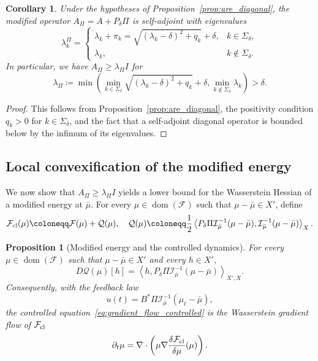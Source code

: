 \documentclass[11pt]{article}
\numberwithin{equation}{section}
\newtheorem{proposition}[theorem]{Proposition}
\newtheorem{corollary}[theorem]{Corollary}
\theoremstyle{definition}
\newcommand{\F}{\mathcal{F}}
\newcommand{\rieszmap}[1][\mu]{\mathcal{I}_{#1}}
\begin{document}
\begin{corollary}
\label{cor:spectral_gap}
    Under the hypotheses of Proposition~\ref{prop:are_diagonal}, the modified operator $A_\Pi = A + P_\delta \Pi$ is self-adjoint with eigenvalues
    \[
    \lambda_k^\Pi =
    \begin{cases}
        \lambda_k + \pi_k = \sqrt{(\lambda_k-\delta)^2 + q_k} + \delta, & k \in \Sigma_\delta,\\
        \lambda_k, & k \notin \Sigma_\delta.
    \end{cases}
    \]
    In particular, we have $A_\Pi \ge \lambda_\Pi I$ for
    \[
    \lambda_\Pi \coloneqq \min\left(\min_{k \in \Sigma_\delta}\sqrt{(\lambda_k-\delta)^2 + q_k} + \delta, \min_{k\notin\Sigma_\delta} \lambda_k\right) > \delta.
    \]
\end{corollary}

\begin{proof}
    This follows from Proposition~\ref{prop:are_diagonal}, the positivity condition $q_k > 0$ for $k \in \Sigma_\delta$, and the fact that a self-adjoint diagonal operator is bounded below by the infimum of its eigenvalues.
\end{proof}

\subsection{Local convexification of the modified energy}
\label{sec:convexification}

We now show that $A_\Pi \ge \lambda_\Pi I$ yields a lower bound for the Wasserstein Hessian of a modified energy at $\bar\mu$.
For every $\mu \in \operatorname{dom}(\F)$ such that $\mu - \bar\mu \in X'$, define
\[
\F_{\rm cl}(\mu) \coloneqq \F(\mu) + \mathcal{Q}(\mu), \quad \mathcal{Q}(\mu) \coloneqq \frac{1}{2}\left\langle P_\delta \Pi \rieszmap[\bar\mu]^{-1}(\mu - \bar\mu), \rieszmap[\bar\mu]^{-1}(\mu - \bar\mu)\right\rangle_X.
\]

\begin{proposition}[Modified energy and the controlled dynamics]
\label{prop:modified_energy_closed_loop}
    For every $\mu \in \operatorname{dom}(\F)$ such that $\mu - \bar\mu \in X'$ and every $h \in X'$,
    \[
    D\mathcal{Q}(\mu)[h] = \left\langle h, P_\delta\Pi\rieszmap[\bar\mu]^{-1}(\mu-\bar\mu)\right\rangle_{X',X}.
    \]
    Consequently, with the feedback law
    \[
    u(t) = B^* \Pi \rieszmap[\bar\mu]^{-1}(\mu_t-\bar\mu),
    \]
    the controlled equation~\eqref{eq:gradient_flow_controlled} is the Wasserstein gradient flow of $\F_{\rm cl}$
    \[
    \partial_t\mu = \nabla\cdot\left( \mu \nabla \frac{\delta\F_{\rm cl}}{\delta\mu}(\mu)\right).
    \]
\end{proposition}
\end{document}
